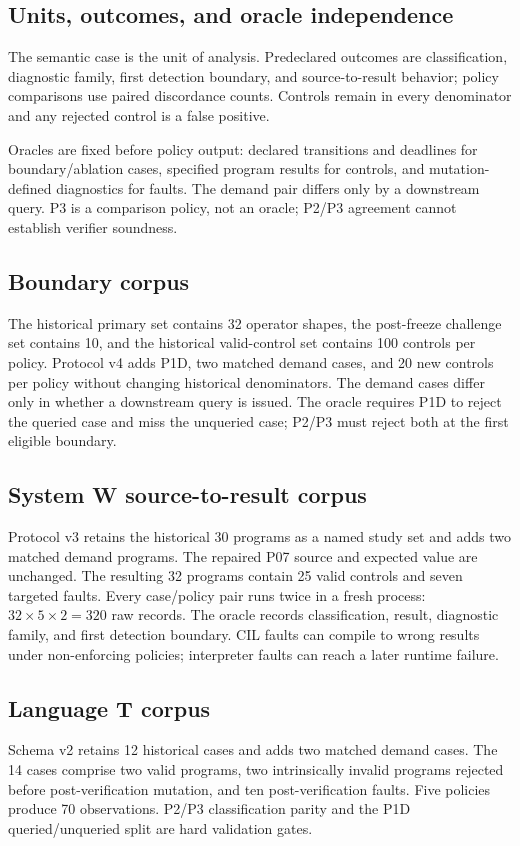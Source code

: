 \subsection{Units, outcomes, and oracle independence}
The semantic case is the unit of analysis. Predeclared outcomes are classification, diagnostic family, first detection boundary, and source-to-result behavior; policy comparisons use paired discordance counts. Controls remain in every denominator and any rejected control is a false positive.

Oracles are fixed before policy output: declared transitions and deadlines for boundary/ablation cases, specified program results for controls, and mutation-defined diagnostics for faults. The demand pair differs only by a downstream query. P3 is a comparison policy, not an oracle; P2/P3 agreement cannot establish verifier soundness.

\subsection{Boundary corpus}
The historical primary set contains 32 operator shapes, the post-freeze challenge set contains 10, and the historical valid-control set contains 100 controls per policy. Protocol v4 adds P1D, two matched demand cases, and 20 new controls per policy without changing historical denominators. The demand cases differ only in whether a downstream query is issued. The oracle requires P1D to reject the queried case and miss the unqueried case; P2/P3 must reject both at the first eligible boundary.

\subsection{System W source-to-result corpus}
Protocol v3 retains the historical 30 programs as a named study set and adds two matched demand programs. The repaired P07 source and expected value are unchanged. The resulting 32 programs contain 25 valid controls and seven targeted faults. Every case/policy pair runs twice in a fresh process: $32\times5\times2=320$ raw records. The oracle records classification, result, diagnostic family, and first detection boundary. CIL faults can compile to wrong results under non-enforcing policies; interpreter faults can reach a later runtime failure.

\subsection{Language T corpus}
Schema v2 retains 12 historical cases and adds two matched demand cases. The 14 cases comprise two valid programs, two intrinsically invalid programs rejected before post-verification mutation, and ten post-verification faults. Five policies produce 70 observations. P2/P3 classification parity and the P1D queried/unqueried split are hard validation gates.

